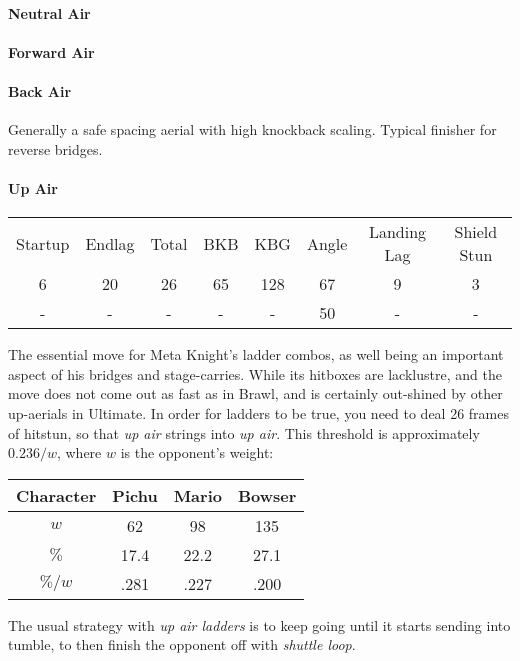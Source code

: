 \paragraph{Neutral Air}
\paragraph{Forward Air}
\paragraph{Back Air}
Generally a safe spacing aerial with high knockback scaling. Typical finisher for reverse bridges.
\paragraph{Up Air}
\begin{center}
	\begin{tabular}{| c  c  c | c  c  c | c  c |}
		\hline
		Startup	& Endlag & Total & BKB & KBG & Angle &	Landing Lag	&	Shield Stun	\\
		6	&	20	&	26	&	65	&	128 & 	67\deg	&	9 	&	3	\\
		-	&	-	&	-	&	- 	& 	- 	&	50\deg	&	-	&	-	\\
		\hline
	\end{tabular}
\end{center}
The essential move for Meta Knight's ladder combos, as well  being an important aspect of his bridges and stage-carries. While its hitboxes are lacklustre, and the move does not come out as fast as in Brawl, and is certainly out-shined by other up-aerials in Ultimate. In order for ladders to be true, you need to deal 26 frames of hitstun, so that \textit{up air} strings into \emph{up air}. This threshold is approximately $0.236/w$, where $w$ is the opponent's weight:
\begin{center}
	\begin{tabular}{| c c c c |}
		\hline
		\textbf{Character} & Pichu & Mario & Bowser	\\
		\hline
		$w$		&	62		&	98		&	135		\\
		$\%$	&	17.4	&	22.2	&	27.1	\\
		$\%/w$	&	.281	&	.227	&	.200	\\
		\hline
	\end{tabular}
\end{center}
The usual strategy with \textit{up air ladders} is to keep going until it starts sending into tumble, to then finish the opponent off with \textit{shuttle loop}.

